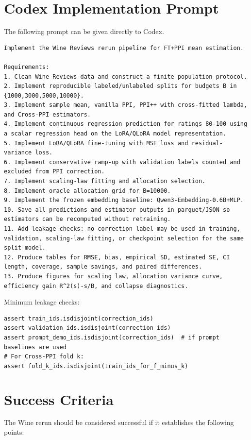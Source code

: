 \documentclass[11pt]{article}
\begin{document}
\section{Codex Implementation Prompt}

The following prompt can be given directly to Codex.

\begin{lstlisting}
Implement the Wine Reviews rerun pipeline for FT+PPI mean estimation.

Requirements:
1. Clean Wine Reviews data and construct a finite population protocol.
2. Implement reproducible labeled/unlabeled splits for budgets B in {1000,3000,5000,10000}.
3. Implement sample mean, vanilla PPI, PPI++ with cross-fitted lambda, and Cross-PPI estimators.
4. Implement continuous regression prediction for ratings 80-100 using a scalar regression head on the LoRA/QLoRA model representation.
5. Implement LoRA/QLoRA fine-tuning with MSE loss and residual-variance loss.
6. Implement conservative ramp-up with validation labels counted and excluded from PPI correction.
7. Implement scaling-law fitting and allocation selection.
8. Implement oracle allocation grid for B=10000.
9. Implement the frozen embedding baseline: Qwen3-Embedding-0.6B+MLP.
10. Save all predictions and estimator outputs in parquet/JSON so estimators can be recomputed without retraining.
11. Add leakage checks: no correction label may be used in training, validation, scaling-law fitting, or checkpoint selection for the same split model.
12. Produce tables for RMSE, bias, empirical SD, estimated SE, CI length, coverage, sample savings, and paired differences.
13. Produce figures for scaling law, allocation variance curve, efficiency gain R^2(s)-s/B, and collapse diagnostics.
\end{lstlisting}

Minimum leakage checks:

\begin{lstlisting}
assert train_ids.isdisjoint(correction_ids)
assert validation_ids.isdisjoint(correction_ids)
assert prompt_demo_ids.isdisjoint(correction_ids)  # if prompt baselines are used
# For Cross-PPI fold k:
assert fold_k_ids.isdisjoint(train_ids_for_f_minus_k)
\end{lstlisting}

\section{Success Criteria}

The Wine rerun should be considered successful if it establishes the following points:
\end{document}
